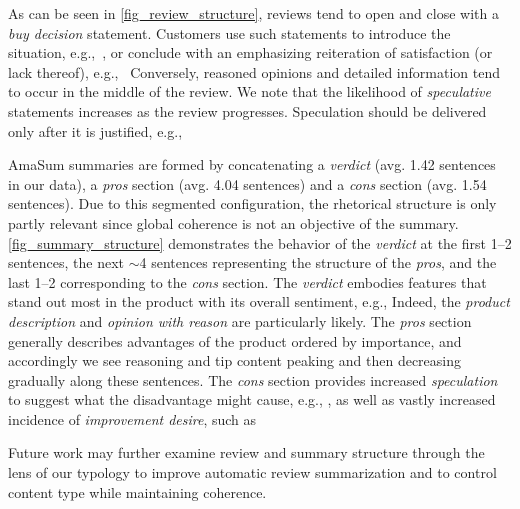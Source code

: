 



As can be seen in \autoref{fig_review_structure}, reviews tend to open and close with a \textit{buy decision} statement. 
Customers use such statements to introduce the situation, e.g.,~, or conclude with an emphasizing reiteration of satisfaction (or lack thereof), e.g.,~
Conversely, reasoned opinions and detailed information tend to occur in the middle of the review. %
We note that the likelihood of \textit{speculative} statements increases as the review progresses. 
Speculation should be delivered only after it is justified, e.g.,~


AmaSum summaries are formed by concatenating a \textit{verdict} (avg. 1.42 sentences in our data), a \textit{pros} section (avg. 4.04 sentences) and a \textit{cons} section (avg. 1.54 sentences). 
Due to this segmented configuration, the rhetorical structure is only partly relevant since global coherence is not an objective of the summary. 
\autoref{fig_summary_structure} demonstrates the behavior of the \emph{verdict} at the first 1--2 sentences, the next $\sim$4 sentences representing the structure of the \emph{pros}, and the last 1--2 corresponding to the \emph{cons} section. 
The \emph{verdict} embodies features that stand out most in the product with its overall sentiment, e.g., 
Indeed, the \textit{product description} and \textit{opinion with reason} \taxtypes{} are particularly likely. 
The \emph{pros} section generally describes advantages of the product ordered by importance, and accordingly we see reasoning and tip content peaking and then decreasing gradually along these sentences.
The \emph{cons} section provides increased  \textit{speculation} to suggest what the disadvantage might cause, e.g., , as well as vastly increased incidence of \textit{improvement desire}, such as 

Future work may further examine review and summary structure through the lens of our typology to improve automatic review summarization and to control content type while maintaining coherence.






%